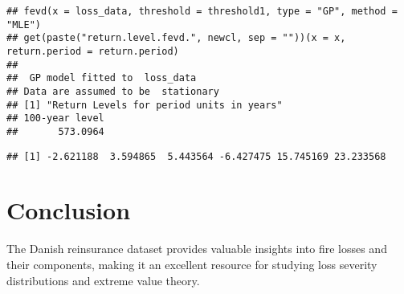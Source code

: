 \documentclass[
  12pt,
]{article}
\newenvironment{Shaded}{\begin{snugshade}}{\end{snugshade}}
\newcommand{\AttributeTok}[1]{\textcolor[rgb]{0.13,0.29,0.53}{#1}}
\newcommand{\DecValTok}[1]{\textcolor[rgb]{0.00,0.00,0.81}{#1}}
\newcommand{\FunctionTok}[1]{\textcolor[rgb]{0.13,0.29,0.53}{\textbf{#1}}}
\newcommand{\NormalTok}[1]{#1}
\newcommand{\OtherTok}[1]{\textcolor[rgb]{0.56,0.35,0.01}{#1}}
\newcommand{\SpecialCharTok}[1]{\textcolor[rgb]{0.81,0.36,0.00}{\textbf{#1}}}
\newcommand{\StringTok}[1]{\textcolor[rgb]{0.31,0.60,0.02}{#1}}
\begin{document}
\begin{verbatim}
## fevd(x = loss_data, threshold = threshold1, type = "GP", method = "MLE")
## get(paste("return.level.fevd.", newcl, sep = ""))(x = x, return.period = return.period)
## 
##  GP model fitted to  loss_data  
## Data are assumed to be  stationary 
## [1] "Return Levels for period units in years"
## 100-year level 
##       573.0964
\end{verbatim}

\begin{Shaded}
\end{Shaded}

\begin{verbatim}
## [1] -2.621188  3.594865  5.443564 -6.427475 15.745169 23.233568
\end{verbatim}

\section{Conclusion}\label{conclusion}

The Danish reinsurance dataset provides valuable insights into fire
losses and their components, making it an excellent resource for
studying loss severity distributions and extreme value theory.
\end{document}
